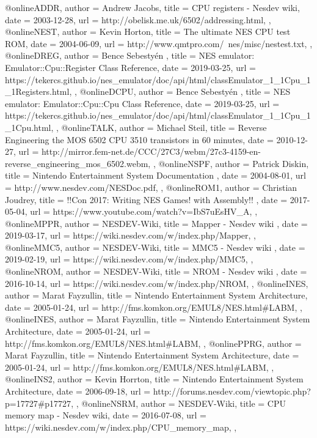 @online{ADDR,
	author = {Andrew Jacobs},
	title = {CPU registers - Nesdev wiki},
	date = {2003-12-28},
	url = {http://obelisk.me.uk/6502/addressing.html},
},
@online{NEST,
	author = {Kevin Horton},
	title = {The ultimate NES CPU test ROM},
	date = {2004-06-09},
	url = {http://www.qmtpro.com/~nes/misc/nestest.txt},
},
@online{DREG,
	author = {Bence Sebestyén },
	title = {NES emulator: Emulator::Cpu::Register Class Reference},
	date = {2019-03-25},
	url = {https://tekercs.github.io/nes_emulator/doc/api/html/classEmulator_1_1Cpu_1_1Registers.html},
},
@online{DCPU,
	author = {Bence Sebestyén },
	title = {NES emulator: Emulator::Cpu::Cpu Class Reference},
	date = {2019-03-25},
	url = {https://tekercs.github.io/nes_emulator/doc/api/html/classEmulator_1_1Cpu_1_1Cpu.html},
},
@online{TALK,
	author = {Michael Steil},
	title = {Reverse Engineering the MOS 6502 CPU 3510 transistors in 60 minutes},
	date = {2010-12-27},
	url = {http://mirror.fem-net.de/CCC/27C3/webm/27c3-4159-en-reverse_engineering_mos_6502.webm},
},
@online{NSPF,
	author = {Patrick Diskin},
	title = {Nintendo Entertainment System Documentation },
	date = {2004-08-01},
	url = {http://www.nesdev.com/NESDoc.pdf},
},
@online{ROM1,
	author = {Christian Joudrey},
	title = {!!Con 2017: Writing NES Games! with Assembly!! },
	date = {2017-05-04},
	url = {https://www.youtube.com/watch?v=IbS7uEsHV_A},
},
@online{MPPR,
	author = {NESDEV-Wiki},
	title = {Mapper - Nesdev wiki },
	date = {2019-03-17},
	url = {https://wiki.nesdev.com/w/index.php/Mapper},
},
@online{MMC5,
	author = {NESDEV-Wiki},
	title = {MMC5 - Nesdev wiki },
	date = {2019-02-19},
	url = {https://wiki.nesdev.com/w/index.php/MMC5},
},
@online{NROM,
	author = {NESDEV-Wiki},
	title = {NROM - Nesdev wiki },
	date = {2016-10-14},
	url = {https://wiki.nesdev.com/w/index.php/NROM},
},
@online{INES,
	author = {Marat Fayzullin},
	title = {Nintendo Entertainment System Architecture},
	date = {2005-01-24},
	url = {http://fms.komkon.org/EMUL8/NES.html#LABM},
},
@online{INES,
	author = {Marat Fayzullin},
	title = {Nintendo Entertainment System Architecture},
	date = {2005-01-24},
	url = {http://fms.komkon.org/EMUL8/NES.html#LABM},
},
@online{PPRG,
	author = {Marat Fayzullin},
	title = {Nintendo Entertainment System Architecture},
	date = {2005-01-24},
	url = {http://fms.komkon.org/EMUL8/NES.html#LABM},
},
@online{INS2,
	author = {Kevin Horrton},
	title = {Nintendo Entertainment System Architecture},
	date = {2006-09-18},
	url = {http://forums.nesdev.com/viewtopic.php?p=17727#p17727},
},
@online{NSRM,
	author = {NESDEV-Wiki},
	title = {CPU memory map - Nesdev wiki},
	date = {2016-07-08},
	url = {https://wiki.nesdev.com/w/index.php/CPU_memory_map},
},

